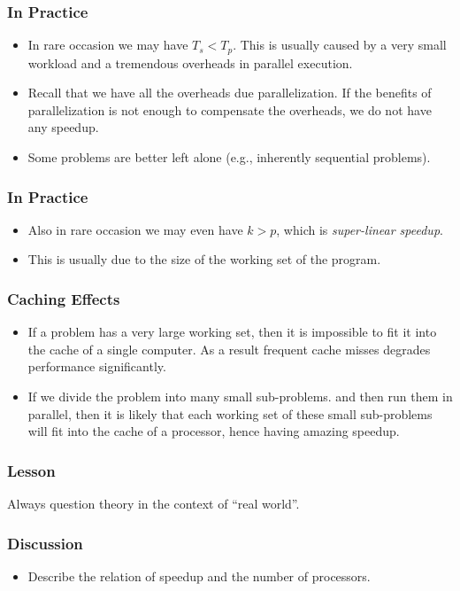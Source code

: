 \documentclass{beamer}
\begin{document}
\begin{CJK}{UTF8}{bsmi}
\begin{frame}
\frametitle{In Practice}
\begin{itemize}
\item In rare occasion we may have $T_s < T_p$.  This is usually
  caused by a very small workload and a tremendous overheads in
  parallel execution.
\item Recall that we have all the overheads due parallelization.  If
  the benefits of parallelization is not enough to compensate the
  overheads, we do not have any speedup.
\item Some problems are better left alone (e.g., inherently sequential
  problems).
\end{itemize}
\end{frame}

\begin{frame}
\frametitle{In Practice}
\begin{itemize}
\item Also in rare occasion we may even have $k > p$, which is {\em
  super-linear speedup}.  
\item This is usually due to the size of the working set of the
  program.
\end{itemize}
\end{frame}

\begin{frame}
\frametitle{Caching Effects}
\begin{itemize}
\item If a problem has a very large working set, then it is impossible
  to fit it into the cache of a single computer.  As a result frequent
  cache misses degrades performance significantly.
\item If we divide the problem into many small sub-problems. and then
  run them in parallel, then it is likely that each working set of
  these small sub-problems will fit into the cache of a processor,
  hence having amazing speedup.
\end{itemize}
\end{frame}

\begin{frame}
\frametitle{Lesson} \huge Always question theory in the context of
``real world''.
\end{frame}

\begin{frame}
\frametitle{Discussion}
\begin{itemize}
\item Describe the relation of speedup and the number of processors.
\end{itemize}
\end{frame}


\end{CJK}
\end{document}
